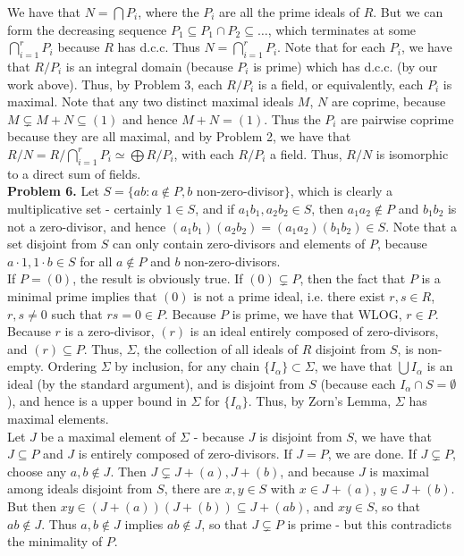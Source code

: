 \documentclass[11pt]{article}
\newcommand{\num}[1]{\noindent \textbf{#1}}
\theoremstyle{definition}
\begin{document}
\noindent We have that $N=\bigcap P_i$, where the $P_i$ are all the prime ideals of $R$. But we can form the decreasing sequence $P_1\subseteq P_1\cap P_2 \subseteq \ldots$, which terminates at some $\bigcap_{i=1}^r P_i$ because $R$ has d.c.c. Thus $N=\bigcap_{i=1}^r P_i$. Note that for each $P_i$, we have that $R/P_i$ is an integral domain (because $P_i$ is prime) which has d.c.c. (by our work above). Thus, by Problem 3, each $R/P_i$ is a field, or equivalently, each $P_i$ is maximal. Note that any two distinct maximal ideals $M$, $N$ are coprime, because $M\subsetneq M+N\subseteq (1)$ and hence $M+N=(1)$. Thus the $P_i$ are pairwise coprime because they are all maximal, and by Problem 2, we have that $R/N=R/\bigcap_{i=1}^r P_i\simeq\bigoplus R/P_i$, with each $R/P_i$ a field. Thus, $R/N$ is isomorphic to a direct sum of fields. \\

\num{Problem 6.} Let $S=\{ab:a\notin P, b$ non-zero-divisor$\}$, which is clearly a multiplicative set - certainly $1\in S$, and if $a_1b_1,a_2b_2\in S$, then $a_1a_2\notin P$ and $b_1b_2$ is not a zero-divisor, and hence $(a_1b_1)(a_2b_2)=(a_1a_2)(b_1b_2)\in S$. Note that a set disjoint from $S$ can only contain zero-divisors and elements of $P$, because $a\cdot1,1\cdot b\in S$ for all $a\notin P$ and $b$ non-zero-divisors.\\

\noindent If $P=(0)$, the result is obviously true. If $(0)\subsetneq P$, then the fact that $P$ is a minimal prime implies that $(0)$ is not a prime ideal, i.e. there exist $r,s\in R$, $r,s\neq0$ such that $rs=0\in P$. Because $P$ is prime, we have that WLOG, $r\in P$. Because $r$ is a zero-divisor, $(r)$ is an ideal entirely composed of zero-divisors, and $(r)\subseteq P$.  Thus, $\Sigma$, the collection of all ideals of $R$ disjoint from $S$, is non-empty. Ordering $\Sigma$ by inclusion, for any chain $\{I_\alpha\}\subset \Sigma$, we have that $\bigcup I_\alpha$ is an ideal (by the standard argument), and is disjoint from $S$ (because each $I_\alpha\cap S=\emptyset$), and hence is a upper bound in $\Sigma$ for $\{I_\alpha\}$. Thus, by Zorn's Lemma, $\Sigma$ has maximal elements.\\

\noindent Let $J$ be a maximal element of $\Sigma$ - because $J$ is disjoint from $S$, we have that $J\subseteq P$ and $J$ is entirely composed of zero-divisors. If $J=P$, we are done. If $J\subsetneq P$, choose any $a,b\notin J$. Then $J\subsetneq J+(a),J+(b)$, and because $J$ is maximal among ideals disjoint from $S$, there are $x,y\in S$ with $x\in J+(a)$, $y\in J+(b)$. But then $xy\in (J+(a))(J+(b))\subseteq J+(ab)$, and $xy\in S$, so that $ab\notin J$. Thus $a,b\notin J$ implies $ab\notin J$, so that $J\subsetneq P$ is prime - but this contradicts the minimality of $P$.\\
\end{document}
